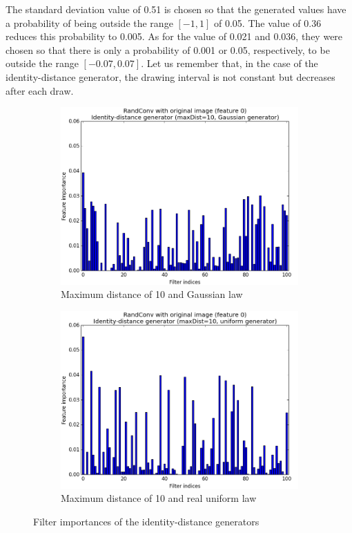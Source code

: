 \documentclass[a4paper]{report}
\begin{document}
	The standard deviation value of 0.51 is chosen so that the generated values have a probability of being outside the range $[-1, 1]$ of 0.05. The value of 0.36 reduces this probability to 0.005. As for the value of 0.021 and 0.036, they were chosen so that there is only a probability of 0.001 or 0.05, respectively, to be outside the range $[-0.07, 0.07]$. Let us remember that, in the case of the identity-distance generator, the drawing interval is not constant but decreases after each draw.
	
	\begin{figure}
		\begin{subfigure}{.5\textwidth}
			\centering
			\includegraphics[width=1.\linewidth]{images/FIIdDistGauss.png}
			\caption{\label{fig:FIIdDistGauss}Maximum distance of 10 and Gaussian law}
		\end{subfigure}%
		\begin{subfigure}{.5\textwidth}
			\centering
			\includegraphics[width=1.\linewidth]{images/FIIdDistRU.png}
			\caption{\label{fig:FIIdDistRU}Maximum distance of 10 and real uniform law}
		\end{subfigure}
		\caption{\label{fig:FIIdDist}Filter importances of the identity-distance generators}
	\end{figure}
	
\end{document}
